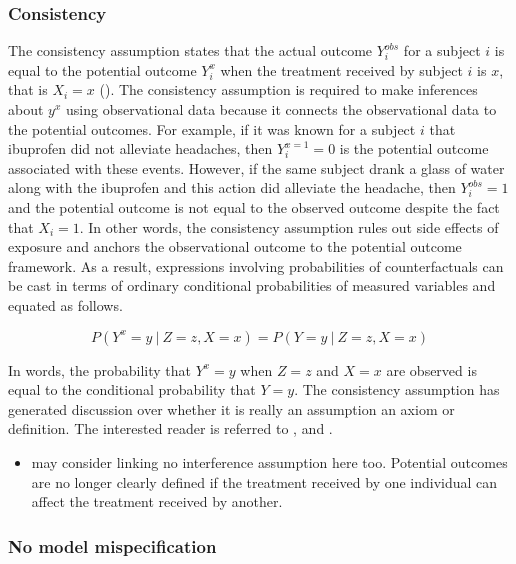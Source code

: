\documentclass[11pt]{article}
\providecommand{\tightlist}{%
      \setlength{\itemsep}{0pt}\setlength{\parskip}{0pt}}
\begin{document}
\subsubsection{Consistency}\label{consistency}

The consistency assumption states that the actual outcome
\(Y_{i}^{obs}\) for a subject \(i\) is equal to the potential outcome
\(Y_{i}^{x}\) when the treatment received by subject \(i\) is \(x\),
that is \(X_i = x\) (\citet{Cole2009}). The consistency assumption is
required to make inferences about \(y^{x}\) using observational data
because it connects the observational data to the potential outcomes.
For example, if it was known for a subject \(i\) that ibuprofen did not
alleviate headaches, then \(Y_{i}^{x=1} = 0\) is the potential outcome
associated with these events. However, if the same subject drank a glass
of water along with the ibuprofen and this action did alleviate the
headache, then \(Y_{i}^{obs} = 1\) and the potential outcome is not
equal to the observed outcome despite the fact that \(X_i=1\). In other
words, the consistency assumption rules out side effects of exposure and
anchors the observational outcome to the potential outcome framework. As
a result, expressions involving probabilities of counterfactuals can be
cast in terms of ordinary conditional probabilities of measured
variables \citet{Pearl2010} and equated as follows.

\[P(Y^x = y\ |\ Z = z, X = x) = P(Y = y\ |\ Z = z, X = x)\]

In words, the probability that \(Y^x = y\) when \(Z = z\) and \(X = x\)
are observed is equal to the conditional probability that \(Y = y\). The
consistency assumption has generated discussion over whether it is
really an assumption an axiom or definition. The interested reader is
referred to \citet{VanderWeele2009}, \citet{Cole2009} and
\citet{Pearl2010}.

\begin{itemize}
\tightlist
\item
  may consider linking no interference assumption here too. Potential
  outcomes are no longer clearly defined if the treatment received by
  one individual can affect the treatment received by another.
\end{itemize}

\subsubsection{No model mispecification}\label{no-model-mispecification}
\end{document}
